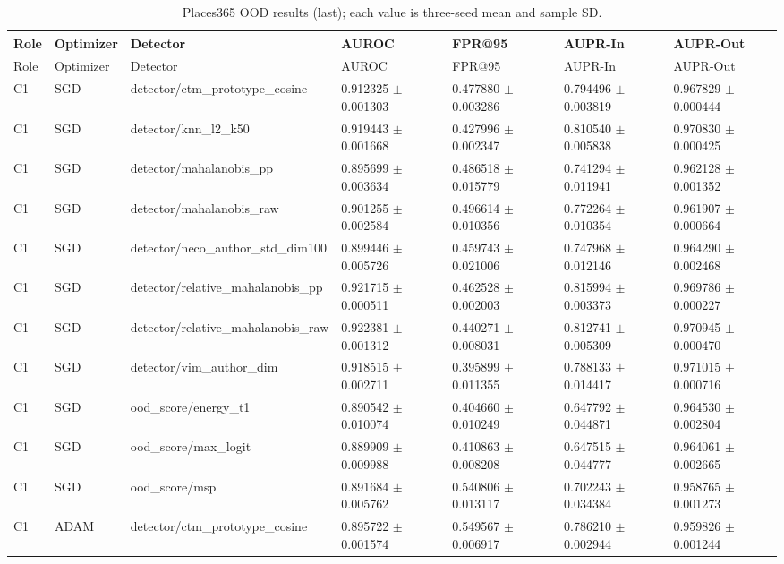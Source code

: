 \begin{longtable}{lllllll}
\caption{Places365 OOD results (last); each value is three-seed mean and sample SD.}\\
Role & Optimizer & Detector & AUROC & FPR@95 & AUPR-In & AUPR-Out \\
\hline
\endfirsthead
Role & Optimizer & Detector & AUROC & FPR@95 & AUPR-In & AUPR-Out \\
\hline
\endhead
C1 & SGD & detector/ctm\_prototype\_cosine & 0.912325 $\pm$ 0.001303 & 0.477880 $\pm$ 0.003286 & 0.794496 $\pm$ 0.003819 & 0.967829 $\pm$ 0.000444 \\
C1 & SGD & detector/knn\_l2\_k50 & 0.919443 $\pm$ 0.001668 & 0.427996 $\pm$ 0.002347 & 0.810540 $\pm$ 0.005838 & 0.970830 $\pm$ 0.000425 \\
C1 & SGD & detector/mahalanobis\_pp & 0.895699 $\pm$ 0.003634 & 0.486518 $\pm$ 0.015779 & 0.741294 $\pm$ 0.011941 & 0.962128 $\pm$ 0.001352 \\
C1 & SGD & detector/mahalanobis\_raw & 0.901255 $\pm$ 0.002584 & 0.496614 $\pm$ 0.010356 & 0.772264 $\pm$ 0.010354 & 0.961907 $\pm$ 0.000664 \\
C1 & SGD & detector/neco\_author\_std\_dim100 & 0.899446 $\pm$ 0.005726 & 0.459743 $\pm$ 0.021006 & 0.747968 $\pm$ 0.012146 & 0.964290 $\pm$ 0.002468 \\
C1 & SGD & detector/relative\_mahalanobis\_pp & 0.921715 $\pm$ 0.000511 & 0.462528 $\pm$ 0.002003 & 0.815994 $\pm$ 0.003373 & 0.969786 $\pm$ 0.000227 \\
C1 & SGD & detector/relative\_mahalanobis\_raw & 0.922381 $\pm$ 0.001312 & 0.440271 $\pm$ 0.008031 & 0.812741 $\pm$ 0.005309 & 0.970945 $\pm$ 0.000470 \\
C1 & SGD & detector/vim\_author\_dim & 0.918515 $\pm$ 0.002711 & 0.395899 $\pm$ 0.011355 & 0.788133 $\pm$ 0.014417 & 0.971015 $\pm$ 0.000716 \\
C1 & SGD & ood\_score/energy\_t1 & 0.890542 $\pm$ 0.010074 & 0.404660 $\pm$ 0.010249 & 0.647792 $\pm$ 0.044871 & 0.964530 $\pm$ 0.002804 \\
C1 & SGD & ood\_score/max\_logit & 0.889909 $\pm$ 0.009988 & 0.410863 $\pm$ 0.008208 & 0.647515 $\pm$ 0.044777 & 0.964061 $\pm$ 0.002665 \\
C1 & SGD & ood\_score/msp & 0.891684 $\pm$ 0.005762 & 0.540806 $\pm$ 0.013117 & 0.702243 $\pm$ 0.034384 & 0.958765 $\pm$ 0.001273 \\
C1 & ADAM & detector/ctm\_prototype\_cosine & 0.895722 $\pm$ 0.001574 & 0.549567 $\pm$ 0.006917 & 0.786210 $\pm$ 0.002944 & 0.959826 $\pm$ 0.001244 \\

\end{longtable}
